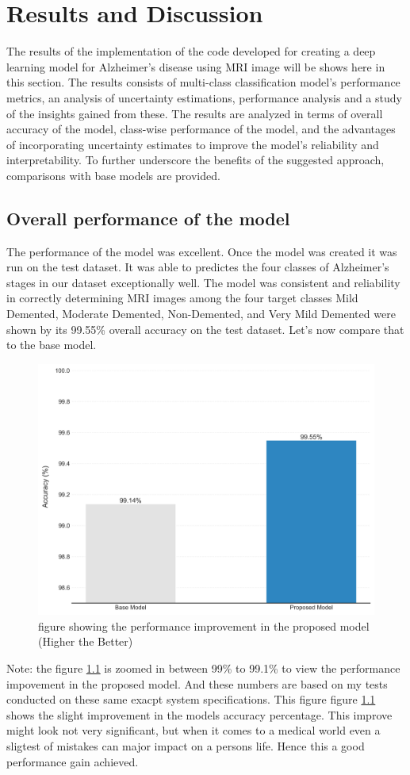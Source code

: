 \documentclass[12pt,onecolumn]{report}
\begin{document}
\chapter{Results and Discussion}
The results of the implementation of the code developed for creating a deep learning model for Alzheimer's disease using MRI image will be shows here in this section. The results consists of multi-class classification model’s performance metrics, an analysis of uncertainty estimations, performance analysis and a study of the insights gained from these. The results are analyzed in terms of overall accuracy of the model, class-wise performance of the model, and the advantages of incorporating uncertainty estimates to improve the model’s reliability and interpretability. To further underscore the benefits of the suggested approach, comparisons with base models are provided.

\section{Overall performance of the model}
The performance of the model was excellent. Once the model was created it was  run on the test dataset. It was able to predictes the four classes of Alzheimer's stages in our dataset exceptionally well. The model was consistent and reliability in correctly determining MRI images among the four target classes Mild Demented, Moderate Demented, Non-Demented, and Very Mild Demented were shown by its 99.55\% overall accuracy on the test dataset. Let's now compare that to the base model.
\begin{figure}[H]
    \centering
    \includegraphics[width=0.8\columnwidth]{figures/res_model_comparison.png}  %
    \caption{figure showing the performance improvement in the proposed model (Higher the Better)} %
    \label{fig:res_model_comparison} %
\end{figure}
Note: the figure \ref{fig:res_model_comparison} is zoomed in between 99\% to 99.1\% to view the performance impovement in the proposed model. And these numbers are based on my tests conducted on these same exacpt system specifications.
This figure figure \ref{fig:res_model_comparison} shows the slight improvement in the models accuracy percentage. This improve might look not very significant, but when it comes to a medical world even a sligtest of mistakes can major impact on a persons life. Hence this a good performance gain achieved.
\end{document}
